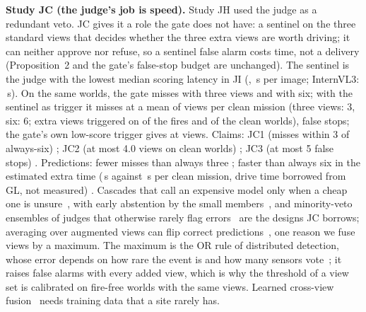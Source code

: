 \textbf{Study JC (the judge's job is speed).} Study JH used the judge as a redundant veto. JC gives it a role the gate does not have: a sentinel on the three standard views that decides whether the three extra views are worth driving; it can neither approve nor refuse, so a sentinel false alarm costs time, not a delivery (Proposition~2 and the gate's false-stop budget are unchanged). The sentinel is the judge with the lowest median scoring latency in JI (\JCPrimary{}, \JCLatSent\,s per image; InternVL3: \JCLatIntern\,s). On the same worlds, the gate misses \JCThreeMiss{} with three views and \JCSixMiss{} with six; with the sentinel as trigger it misses \JCSentMiss{} at a mean of \JCSentViews{} views per clean mission (three views: 3, six: 6; extra views triggered on \JCTrigFire{} of the fires and \JCTrigClean{} of the clean worlds), \JCSentFS{} false stops; the gate's own low-score trigger gives \JCOwnMiss{} at \JCOwnViews{} views. Claims: JC1 (misses within 3 of always-six) \JCOneHolds; JC2 (at most 4.0 views on clean worlds) \JCTwoHolds; JC3 (at most 5 false stops) \JCThreeHolds. Predictions: fewer misses than always three \JCPredOneHolds; faster than always six in the estimated extra time (\JCSentSecs\,s against \JCSixSecs\,s per clean mission, drive time borrowed from GL, not measured) \JCPredTwoHolds.
Cascades that call an expensive model only when a cheap one is unsure~\cite{chen2023frugalgpt}, with early abstention by the small members~\cite{zellinger2025abstention}, and minority-veto ensembles of judges that otherwise rarely flag errors~\cite{jain2025agreeableness} are the designs JC borrows; averaging over augmented views can flip correct predictions~\cite{shanmugam2020tta}, one reason we fuse views by a maximum. The maximum is the OR rule of distributed detection, whose error depends on how rare the event is and how many sensors vote~\cite{nardelli2015fusionrules}; it raises false alarms with every added view, which is why the threshold of a view set is calibrated on fire-free worlds with the same views. Learned cross-view fusion~\cite{he2024mvad} needs training data that a site rarely has.
